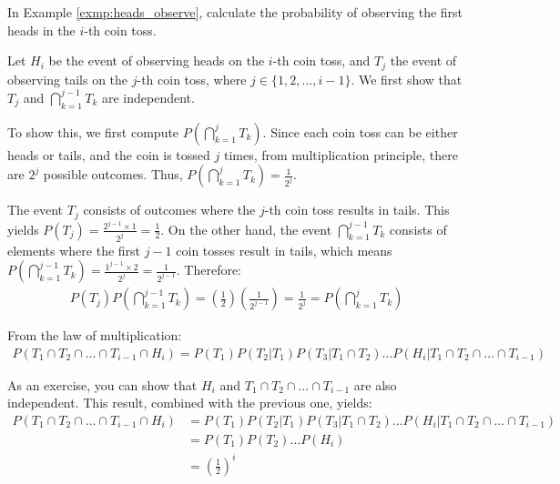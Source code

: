 \begin{exmp}
	In Example \autoref{exmp:heads_observe}, calculate the probability of observing the first heads in the \( i \)-th coin toss.
\end{exmp}
\begin{solution}
	Let \( H_i \) be the event of observing heads on the \( i \)-th coin toss, and \( T_j \) the event of observing tails on the \( j \)-th coin toss,
	where \( j \in \{ 1, 2, \ldots, i - 1 \} \).
	We first show that \( T_j \) and \( \bigcap_{k = 1}^{j - 1} T_{k} \) are independent.

	To show this, we first compute \( P(\bigcap_{k = 1}^{j} T_{k}) \).
	Since each coin toss can be either heads or tails, and the coin is tossed \( j \) times,
	from multiplication principle, there are \( 2^j \) possible outcomes.
	Thus, \( P(\bigcap_{k = 1}^{j} T_{k}) = \frac{1}{2^j} \).

	The event \( T_{j} \) consists of outcomes where the \( j \)-th coin toss results in tails.
	This yields \( P(T_{j}) = \frac{2^{j - 1} \times 1}{2^j} = \frac{1}{2} \).
	On the other hand, the event \( \bigcap_{k = 1}^{j - 1} T_{k} \) consists of elements where the first \( j - 1 \) coin tosses result in tails,
	which means \( P(\bigcap_{k = 1}^{j - 1} T_{k}) = \frac{1^{j - 1} \times 2}{2^j} = \frac{1}{2^{j - 1}} \).
	Therefore:
	\begin{gather*}
		P(T_{j})P(\bigcap_{k = 1}^{j - 1} T_{k}) = (\frac{1}{2})(\frac{1}{2^{j - 1}}) = \frac{1}{2^j} = P(\bigcap_{k = 1}^{j} T_{k})
	\end{gather*}

	From the law of multiplication:
	\begin{gather*}
		P(T_1 \cap T_2 \cap \ldots \cap T_{i - 1} \cap H_i) = P(T_1)P(T_2 | T_1)P(T_3 | T_1 \cap T_2) \ldots P(H_i | T_1 \cap T_2 \cap \ldots \cap T_{i - 1})
	\end{gather*}

	As an exercise, you can show that \( H_i \) and \( T_1 \cap T_2 \cap \ldots \cap T_{i - 1} \) are also independent.
	This result, combined with the previous one, yields:
	\begin{align*}
		P(T_1 \cap T_2 \cap \ldots \cap T_{i - 1} \cap H_i) &= P(T_1)P(T_2 | T_1)P(T_3 | T_1 \cap T_2) \ldots P(H_i | T_1 \cap T_2 \cap \ldots \cap T_{i - 1})\\
		&= P(T_1)P(T_2) \ldots P(H_i)\\
		&= (\frac{1}{2})^i
	\end{align*}
\end{solution}

